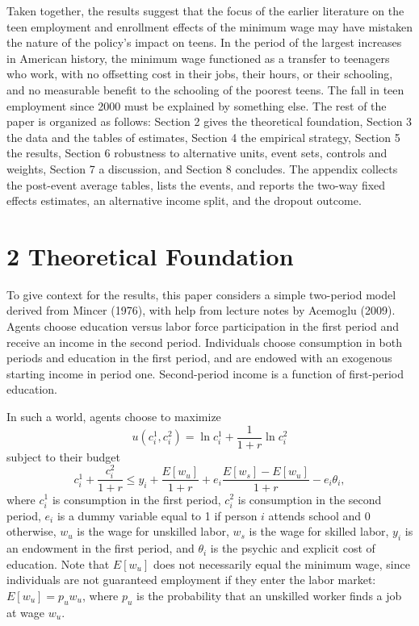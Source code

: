 \documentclass[12pt]{article}
\begin{document}
Taken together, the results suggest that the focus of the earlier literature on the teen employment and enrollment effects of the minimum wage may have mistaken the nature of the policy's impact on teens. In the period of the largest increases in American history, the minimum wage functioned as a transfer to teenagers who work, with no offsetting cost in their jobs, their hours, or their schooling, and no measurable benefit to the schooling of the poorest teens. The fall in teen employment since 2000 must be explained by something else. The rest of the paper is organized as follows: Section 2 gives the theoretical foundation, Section 3 the data and the tables of estimates, Section 4 the empirical strategy, Section 5 the results, Section 6 robustness to alternative units, event sets, controls and weights, Section 7 a discussion, and Section 8 concludes. The appendix collects the post-event average tables, lists the events, and reports the two-way fixed effects estimates, an alternative income split, and the dropout outcome.

\section{2 Theoretical Foundation}

To give context for the results, this paper considers a simple two-period model derived from Mincer (1976), with help from lecture notes by Acemoglu (2009). Agents choose education versus labor force participation in the first period and receive an income in the second period. Individuals choose consumption in both periods and education in the first period, and are endowed with an exogenous starting income in period one. Second-period income is a function of first-period education.

In such a world, agents choose to maximize
\begin{equation}
u(c^1_i, c^2_i) = \ln c^1_i + \frac{1}{1+r} \ln c^2_i

\end{equation}
subject to their budget
\begin{equation}
c^1_i + \frac{c^2_i}{1+r} \le y_i + \frac{E[w_u]}{1+r} + e_i \frac{E[w_s] - E[w_u]}{1+r} - e_i \theta_i ,

\end{equation}
where $c^1_i$ is consumption in the first period, $c^2_i$ is consumption in the second period, $e_i$ is a dummy variable equal to 1 if person $i$ attends school and 0 otherwise, $w_u$ is the wage for unskilled labor, $w_s$ is the wage for skilled labor, $y_i$ is an endowment in the first period, and $\theta_i$ is the psychic and explicit cost of education. Note that $E[w_u]$ does not necessarily equal the minimum wage, since individuals are not guaranteed employment if they enter the labor market: $E[w_u] = p_u w_u$, where $p_u$ is the probability that an unskilled worker finds a job at wage $w_u$.
\end{document}
